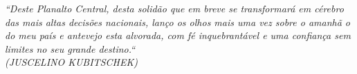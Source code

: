 \begin{epigrafe}
    \vspace*{\fill}
    \hspace{.35\textwidth}
    {\begin{minipage}{.6\textwidth}
    	\begin{flushright}
            \textit{``Deste Planalto Central, desta solidão que em breve se transformará em cérebro das mais altas decisões nacionais, lanço os olhos mais uma vez sobre o amanhã o do meu país e antevejo esta alvorada, com fé inquebrantável e uma confiança sem limites no seu grande destino.``\\
                (JUSCELINO KUBITSCHEK)}
        \end{flushright}
    \end{minipage}}%

\end{epigrafe}
